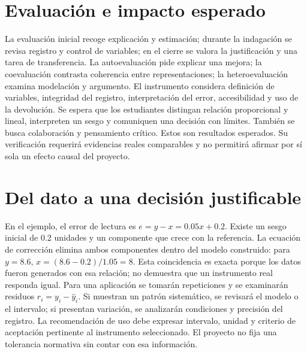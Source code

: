 \documentclass[spanish,letterpaper,oneside]{article}
\begin{document}
\section{Evaluación e impacto esperado}
La evaluación inicial recoge explicación y estimación; durante la indagación se revisa registro y control de variables; en el cierre se valora la justificación y una tarea de transferencia. La autoevaluación pide explicar una mejora; la coevaluación contrasta coherencia entre representaciones; la heteroevaluación examina modelación y argumento. El instrumento considera definición de variables, integridad del registro, interpretación del error, accesibilidad y uso de la devolución.
Se espera que los estudiantes distingan relación proporcional y lineal, interpreten un sesgo y comuniquen una decisión con límites. También se busca colaboración y pensamiento crítico. Estos son resultados esperados. Su verificación requerirá evidencias reales comparables y no permitirá afirmar por sí sola un efecto causal del proyecto.
\section{Del dato a una decisión justificable}
En el ejemplo, el error de lectura es $e=y-x=0.05x+0.2$. Existe un sesgo inicial de 0.2 unidades y un componente que crece con la referencia. La ecuación de corrección elimina ambos componentes dentro del modelo construido: para $y=8.6$, $x=(8.6-0.2)/1.05=8$. Esta coincidencia es exacta porque los datos fueron generados con esa relación; no demuestra que un instrumento real responda igual.
Para una aplicación se tomarán repeticiones y se examinarán residuos $r_i=y_i-\widehat y_i$. Si muestran un patrón sistemático, se revisará el modelo o el intervalo; si presentan variación, se analizarán condiciones y precisión del registro. La recomendación de uso debe expresar intervalo, unidad y criterio de aceptación pertinente al instrumento seleccionado. El proyecto no fija una tolerancia normativa sin contar con esa información.
\end{document}
